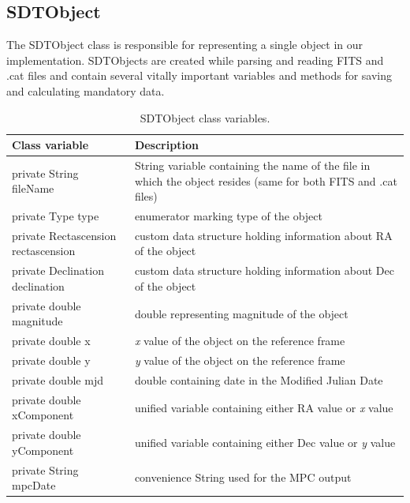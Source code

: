 \newpage

\subsection{SDTObject}\label{subsec:object}

	The SDTObject class is responsible for representing a single object in our implementation. SDTObjects are created while parsing and reading FITS and .cat files and contain several vitally important variables and methods for saving and calculating mandatory data.
	
\begin{table}[H]
\centering
\setlength{\extrarowheight}{2pt}
\begin{tabularx}{\textwidth}{|X|X|}
\hline
\textbf{Class variable} & \textbf{Description} \\ \hline
private String \mbox{fileName} & String variable containing the name of the file in which the object resides (same for both FITS and .cat files) \\ \hline
private Type \mbox{type} & enumerator marking type of the object \\ \hline
private \mbox{Rectascension} \mbox{rectascension} & custom data structure holding information about RA of the object \\ \hline
private \mbox{Declination} \mbox{declination} & custom data structure holding information about Dec of the object \\ \hline
private double \mbox{magnitude} & double representing magnitude of the object \\ \hline
private double \mbox{x} & \emph{x} value of the object on the reference frame \\ \hline
private double \mbox{y} & \emph{y} value of the object on the reference frame \\ \hline
private double \mbox{mjd} & double containing date in the Modified Julian Date \\ \hline
private double \mbox{xComponent} & unified variable containing either RA value or \emph{x} value \\ \hline
private double \mbox{yComponent} & unified variable containing either Dec value or \emph{y} value \\ \hline
private String mpcDate & convenience String used for the MPC output \\ \hline
\end{tabularx}
\caption{SDTObject class variables.}
\label{tab:class_variables_O}
\end{table}

